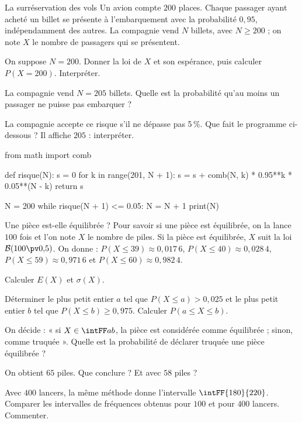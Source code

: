 \begin{exercice}[3]{La surréservation des vols}
Un avion compte $200$ places. Chaque passager ayant acheté un billet se présente à l'embarquement avec la probabilité $0{,}95$,
indépendamment des autres. La compagnie vend $N$ billets, avec $N\geq200$ ; on note $X$ le nombre de passagers qui se présentent.
\begin{questions}
  \item On suppose $N=200$. Donner la loi de $X$ et son espérance, puis calculer $P(X=200)$. Interpréter.
  \item La compagnie vend $N=205$ billets. Quelle est la probabilité qu'au moins un passager ne puisse pas embarquer ?
  \item La compagnie accepte ce risque s'il ne dépasse pas 5\,\%. Que fait le programme ci-dessous ? Il affiche $205$ : interpréter.
\begin{python}
from math import comb

def risque(N):
    s = 0
    for k in range(201, N + 1):
        s = s + comb(N, k) * 0.95**k * 0.05**(N - k)
    return s

N = 200
while risque(N + 1) <= 0.05:
    N = N + 1
print(N)
\end{python}
\end{questions}
\end{exercice}

\begin{exercice}[3]{Une pièce est-elle équilibrée ?}
Pour savoir si une pièce est équilibrée, on la lance $100$ fois et l'on note $X$ le nombre de piles. Si la pièce est équilibrée,
$X$ suit la loi $\mathcal{B}(100\pv0{,}5)$. On donne : $P(X\leq39)\approx0{,}017\,6$, $P(X\leq40)\approx0{,}028\,4$,
$P(X\leq59)\approx0{,}971\,6$ et $P(X\leq60)\approx0{,}982\,4$.
\begin{questions}
  \item Calculer $E(X)$ et $\sigma(X)$.
  \item Déterminer le plus petit entier $a$ tel que $P(X\leq a)>0{,}025$ et le plus petit entier $b$ tel que $P(X\leq b)\geq0{,}975$.
    Calculer $P(a\leq X\leq b)$.
  \item On décide : « si $X\in\intFF ab$, la pièce est considérée comme équilibrée ; sinon, comme truquée ». Quelle est la
    probabilité de déclarer truquée une pièce équilibrée ?
  \item On obtient $65$ piles. Que conclure ? Et avec $58$ piles ?
  \item Avec $400$ lancers, la même méthode donne l'intervalle $\intFF{180}{220}$. Comparer les intervalles de fréquences
    obtenus pour $100$ et pour $400$ lancers. Commenter.
\end{questions}
\end{exercice}
